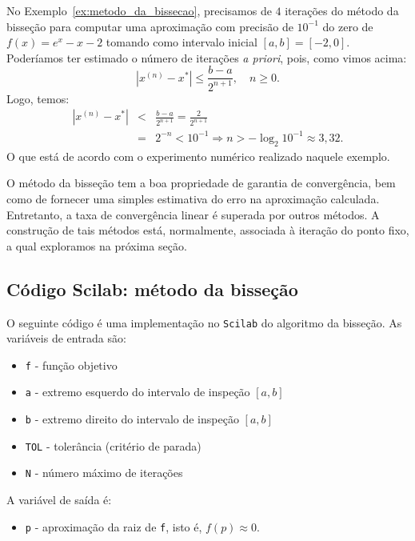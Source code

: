 \begin{ex}No Exemplo~\ref{ex:metodo_da_bissecao}, precisamos de $4$ iterações do método da bisseção para computar uma aproximação com precisão de $10^{-1}$ do zero de $f(x) = e^x - x - 2$ tomando como intervalo inicial $[a, b] = [-2, 0]$. Poderíamos ter estimado o número de iterações \emph{a priori}, pois, como vimos acima:
  \begin{equation*}
    |x^{(n)}-x^*|\leq \frac{b-a}{2^{n+1}},\quad n\geq 0.
  \end{equation*}
Logo, temos:
\begin{eqnarray*}
  |x^{(n)} - x^*| &<& \frac{b - a}{2^{n+1}} = \frac{2}{2^{n+1}}\\
  &=& 2^{-n} < 10^{-1} \Rightarrow  n > -\log_2 10^{-1} \approx 3,32.
\end{eqnarray*}
O que está de acordo com o experimento numérico realizado naquele exemplo.
\end{ex}

O método da bisseção tem a boa propriedade de garantia de convergência, bem como de fornecer uma simples estimativa do erro na aproximação calculada. Entretanto, a taxa de convergência linear é superada por outros métodos. A construção de tais métodos está, normalmente, associada à iteração do ponto fixo, a qual exploramos na próxima seção.

\ifisscilab
\subsection{Código Scilab: método da bisseção}\label{subsec:codigo_bissecao}

O seguinte código é uma implementação no \verb+Scilab+ do algoritmo da bisseção. As variáveis de entrada são:
\begin{itemize}
\item \verb+f+ - função objetivo
\item \verb+a+ - extremo esquerdo do intervalo de inspeção $[a, b]$
\item \verb+b+ - extremo direito do intervalo de inspeção $[a, b]$
\item \verb+TOL+ - tolerância (critério de parada)
\item \verb+N+ - número máximo de iterações
\end{itemize}
A variável de saída é:
\begin{itemize}
\item \verb+p+ - aproximação da raiz de \verb+f+, isto é, $f(p) \approx 0$.
\end{itemize}


